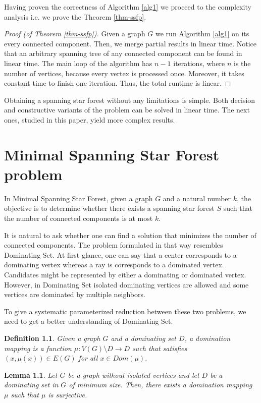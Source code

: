 \documentclass[en]{pracamgr}
\newtheorem{definition}{Definition}
\newtheorem{lemma}{Lemma}
\newcommand{\ssf}{spanning star forest}
\newcommand{\mssfp}{{\sc Minimal Spanning Star Forest}}
\newcommand{\domsetp}{{\sc Dominating Set}}
\begin{document}
Having proven the correctness of Algorithm \ref{alg1} we proceed to the complexity analysis i.e. we prove the Theorem \ref{thm-ssfp}.

\begin{proof}[Proof (of Theorem \ref{thm-ssfp})]
	Given a graph $G$ we run Algorithm \ref{alg1} on its every connected component. Then, we  merge partial results in linear time. Notice that an arbitrary spanning tree of any connected component can be found in linear time. The main loop of the algorithm has $n-1$ iterations, where $n$ is the number of vertices, because every vertex is processed once. Moreover, it takes constant time to finish one iteration. Thus, the total runtime is linear.
\end{proof}

Obtaining a \ssf{} without any limitations is simple. Both decision and constructive variants of the problem can be solved in linear time. The next ones, studied in this paper, yield more complex results.

\chapter{Minimal Spanning Star Forest problem}

In \mssfp{}, given a graph $G$ and a natural number $k$, the objective is to determine whether there exists a \ssf{} $S$ such that the number of connected components is at most $k$.

It is natural to ask whether one can find a solution that minimizes the number of connected components. The problem formulated in that way resembles \domsetp{}. At first glance, one can say that a center corresponds to a dominating vertex whereas a ray is corresponds to a dominated vertex. Candidates might be represented by either a dominating or dominated vertex. However, in \domsetp{} isolated dominating vertices are allowed and some vertices are dominated by multiple neighbors. 

To give a systematic parameterized reduction between these two problems, we need to get a better understanding of \domsetp{}.

\begin{definition}
	Given a graph $G$ and a dominating set $D$, a {\normalfont domination mapping} is a function $\mu:V(G) \setminus D \rightarrow D$ such that satisfies $(x,\mu(x)) \in E(G)$ for all $x \in Dom(\mu)$.
\end{definition}

\begin{lemma}\label{dom mapping}
	Let $G$ be a graph without isolated vertices and let $D$ be a dominating set in $G$ of minimum size. Then, there exists a domination mapping $\mu$ such that $\mu$ is surjective.
\end{lemma}
\end{document}
